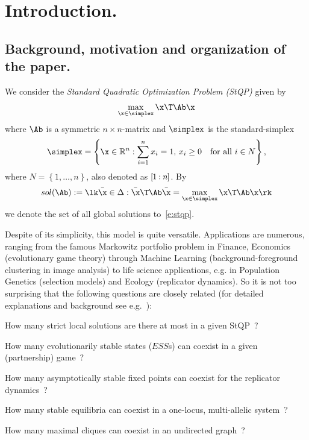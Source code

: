 \documentclass[moor]{informs3}              %
\def\rg#1#2{{ [\kern-.5pt{#1}\kern-.5pt : \kern-.5pt {#2}\kern-.5pt]}}
\def\coma#1{{#1}}
\begin{document}
\maketitle


\section{Introduction.}

\subsection{Background, motivation and organization of the paper.}

We consider the \emph{Standard Quadratic Optimization Problem (StQP)} given by
\begin{equation}\label{e:stqp}
\max_{\x \in \simplex} \x \T \Ab \x
\end{equation}
where $\Ab$ is a symmetric $n \times n$-matrix and $\simplex$ is the standard-simplex
$$
\simplex=\left\{ \x\in\mathbb{R}^{n}:\sum_{i=1}^{n}x_{i}=1,\, x_{i}\geq0\quad\mbox{for all }i \in N \right\} \mbox{,}
$$
where $N=\left\{1,\dots,n \right\}$, also denoted as $\rg 1n$. \coma{By
$${sol}(\Ab) :=\lk \bar\x\in \Delta : \bar\x\T\Ab\bar\x = \max_{\x \in \simplex} \x \T \Ab \x\rk$$
we denote the set of all global solutions to~\eqref{e:stqp}.}

Despite of its simplicity, this model is quite versatile. Applications are numerous, ranging from the famous Markowitz portfolio problem in Finance, Economics (evolutionary game theory) through Machine Learning (background-foreground clustering in image analysis) to life science applications, e.g. in Population Genetics (selection models) and Ecology (replicator dynamics). So it is not too surprising that the following questions are closely related (for detailed explanations and background see e.g.~\cite{Bomz02a,Hofb98,Sand10a,Weib95}):

How many strict local solutions are there at most in a given StQP~?

How many evolutionarily stable states ($ESS$s) can coexist in a given (partnership) game~?

How many asymptotically stable fixed points can coexist for the replicator dynamics~?

How many stable equilibria can coexist in a one-locus, multi-allelic system~?

How many maximal cliques can coexist in an undirected graph~?
\end{document}
